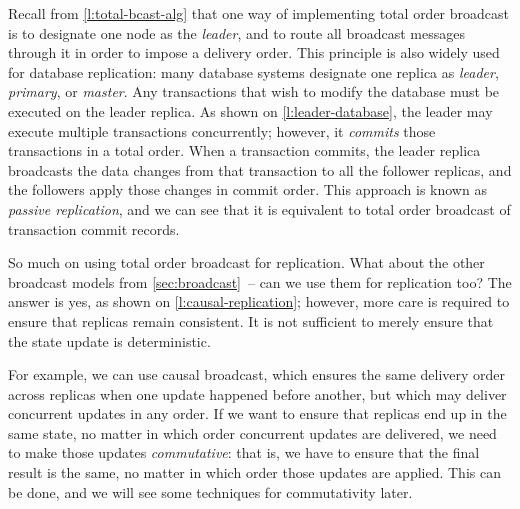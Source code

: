 Recall from \autoref{l:total-bcast-alg} that one way of implementing total order broadcast is to designate one node as the \emph{leader}, and to route all broadcast messages through it in order to impose a delivery order.
This principle is also widely used for database replication: many database systems designate one replica as \emph{leader}, \emph{primary}, or \emph{master}.
Any transactions that wish to modify the database must be executed on the leader replica.
As shown on \autoref{l:leader-database}, the leader may execute multiple transactions concurrently; however, it \emph{commits} those transactions in a total order.
When a transaction commits, the leader replica broadcasts the data changes from that transaction to all the follower replicas, and the followers apply those changes in commit order.
This approach is known as \emph{passive replication}, and we can see that it is equivalent to total order broadcast of transaction commit records.

So much on using total order broadcast for replication.
What about the other broadcast models from \autoref{sec:broadcast}~-- can we use them for replication too?
The answer is yes, as shown on \autoref{l:causal-replication}; however, more care is required to ensure that replicas remain consistent.
It is not sufficient to merely ensure that the state update is deterministic.

For example, we can use causal broadcast, which ensures the same delivery order across replicas when one update happened before another, but which may deliver concurrent updates in any order.
If we want to ensure that replicas end up in the same state, no matter in which order concurrent updates are delivered, we need to make those updates \emph{commutative}: that is, we have to ensure that the final result is the same, no matter in which order those updates are applied.
This can be done, and we will see some techniques for commutativity later. %

